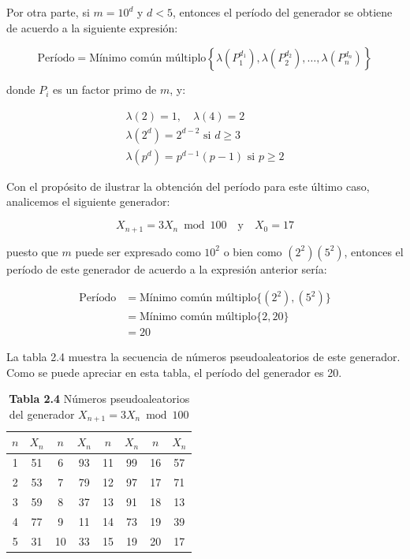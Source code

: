 \documentclass[11pt,letterpaper]{report}
\begin{document}
Por otra parte, si $m=10^d$ y $d<5$, entonces el período del generador
se obtiene de acuerdo a la siguiente expresión:

\begin{equation}
\text{Período} = \text{Mínimo común múltiplo} \left\{ \lambda(P_1^{d_1}), \lambda(P_2^{d_2}), \ldots, \lambda(P_n^{d_n}) \right\}
\end{equation}

donde $P_i$ es un factor primo de $m$, y:

\begin{align*}
\lambda(2) = 1, \quad \lambda(4) = 2 \\
\lambda(2^d) = 2^{d-2} \text{ si } d \ge 3 \\
\lambda(p^d) = p^{d-1}(p-1) \text{ si } p \ge 2
\end{align*}

Con el propósito de ilustrar la obtención del período para este último
caso, analicemos el siguiente generador:

\[
X_{n+1} = 3X_n \bmod 100 \quad \text{y} \quad X_0 = 17
\]

puesto que $m$ puede ser expresado como $10^2$ o bien como $(2^2)(5^2)$,
entonces el período de este generador de acuerdo a la expresión anterior
sería:

\begin{align*}
\text{Período} &= \text{Mínimo común múltiplo} \{ (2^2), (5^2) \} \\
&= \text{Mínimo común múltiplo} \{2, 20\} \\
&= 20
\end{align*}

La tabla 2.4 muestra la secuencia de números pseudoaleatorios de este
generador. Como se puede apreciar en esta tabla, el período del
generador es 20.

\begin{table}[H]
\centering
\caption*{\textbf{Tabla 2.4} Números pseudoaleatorios del generador $X_{n+1} = 3X_n \bmod 100$}
\begin{tabular}{cccccccc}
\toprule
$n$ & $X_n$ & $n$ & $X_n$ & $n$ & $X_n$ & $n$ & $X_n$ \\
\midrule
1 & 51 & 6 & 93 & 11 & 99 & 16 & 57 \\
2 & 53 & 7 & 79 & 12 & 97 & 17 & 71 \\
3 & 59 & 8 & 37 & 13 & 91 & 18 & 13 \\
4 & 77 & 9 & 11 & 14 & 73 & 19 & 39 \\
5 & 31 & 10 & 33 & 15 & 19 & 20 & 17 \\
\bottomrule
\end{tabular}
\end{table}
\end{document}
